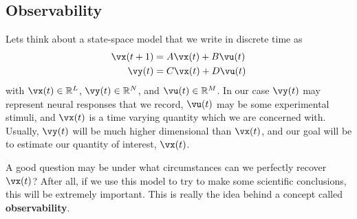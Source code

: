 \documentclass[a4paper,11pt]{exam}
\newcounter{ct}
\newcommand{\field}[1]{\ensuremath{\mathbb{#1}}}
\newcommand{\reals}{\field{R}}
\begin{document}
\subsection*{Observability}
Lets think about a state-space model that we write in discrete time as
\begin{align}
    \vx(t+1) &= A \vx(t) + B \vu(t)\\
    \vy(t) &= C \vx(t) + D \vu(t)
\end{align}
with $\vx(t) \in \reals^L$, $\vy(t) \in \reals^N$, and $\vu(t) \in \reals^M$. In our case $\vy(t)$ may represent neural responses that we record, $\vu(t)$ may be some experimental stimuli, and $\vx(t)$ is a time varying quantity which we are concerned with.  Usually, $\vy(t)$ will be much higher dimensional than $\vx(t)$, and our goal will be to estimate our quantity of interest, $\vx(t)$.

A good question may be under what circumstances can we perfectly recover $\vx(t)$? After all, if we use this model to try to make some scientific conclusions, this will be extremely important.  This is really the idea behind a concept called \textbf{observability}.
\end{document}
